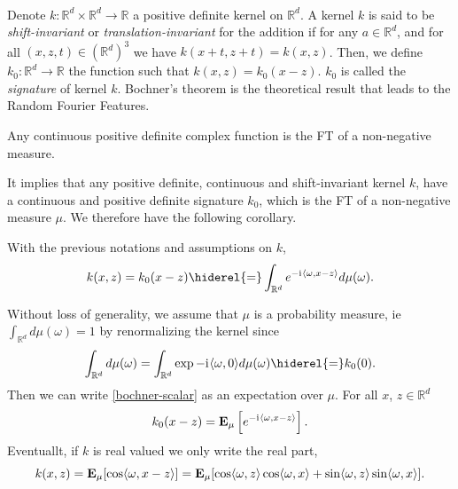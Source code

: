 \paragraph{}
Denote $k: \mathbb{R}^d \times \mathbb{R}^d \to \mathbb{R}$ a positive
definite kernel on $\mathbb{R}^d$. A kernel $k$ is said to be
\emph{shift-invariant} or \emph{translation-invariant} for the addition if for
any $a \in \mathbb{R}^d$, and for all $(x,z,t) \in \left(\mathbb{R}^d\right)^3$
we have $k(x+t,z+t) = k(x,z)$.  Then, we define $k_0: \mathbb{R}^d \to
\mathbb{R}$ the function such that $k(x,z)= k_0(x-z)$. $k_0$ is called the
\emph{signature} of kernel $k$. Bochner's theorem \cite{folland1994course} is
the theoretical result that leads to the Random Fourier Features.
\begin{theorem}\label{th:bochner-scalar}
    Any continuous positive definite complex function is the \acl{FT} of a
    non-negative measure.
\end{theorem}
It implies that any positive definite, continuous and shift-invariant kernel
$k$, have a continuous and positive definite signature $k_0$, which is the
\acl{FT} of a non-negative measure $\mu$. We therefore have the following
corollary.
\begin{corollary}\label{c:bochner-app}
    With the previous notations and assumptions on $k$,
    \begin{dmath}\label{bochner-scalar}
        k(x,z)=k_0(x-z) \hiderel{=} \int_{\mathbb{R}^d} e^{-\iu \inner{\omega,x
        - z}} d\mu(\omega).
    \end{dmath}
\end{corollary}
Without loss of generality, we assume that $\mu$ is a probability measure,
\acs{ie} $\int_{\mathbb{R}^d} d\mu(\omega)=1$ by renormalizing the kernel since
\begin{dmath*}
    \int_{\mathbb{R}^d}d\mu(\omega)= \int_{\mathbb{R}^d}\exp{-\iu
    \inner{\omega, 0}}d\mu(\omega)\hiderel{=}k_0(0). 
\end{dmath*}
Then we can write \cref{bochner-scalar} as an
expectation over $\mu$. For all $x$,
$z\in\mathbb{R}^d$
\begin{dmath*}
    k_0(x-z) = \expectation_{\mu}\left[e^{-\iu \inner{\omega,x - z}}\right].
\end{dmath*}
Eventuallt, if $k$ is real valued we only write the real part, 
\begin{dmath*}
    k(x,z) = \expectation_{\mu}[\cos \inner{\omega,x - z}] =
    \expectation_{\mu}[ \cos \inner{\omega,z} \cos \inner{\omega,x} + \sin
    \inner{\omega,z} \sin \inner{\omega,x}].
\end{dmath*}
